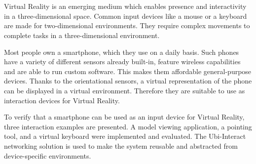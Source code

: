 \chapter{\abstractname}

Virtual Reality is an emerging medium which enables presence and interactivity in a three-dimensional space. Common input devices like a mouse or a keyboard are made for two-dimensional environments. They require complex movements to complete tasks in a three-dimensional environment.%

Most people own a smartphone, which they use on a daily basis. Such phones have a variety of different sensors already built-in, feature wireless capabilities and are able to run custom software. This makes them affordable general-purpose devices. Thanks to the orientational sensors, a virtual representation of the phone can be displayed in a virtual environment. Therefore they are suitable to use as interaction devices for Virtual Reality.

To verify that a smartphone can be used as an input device for Virtual Reality, three interaction examples are presented. A model viewing application, a pointing tool, and a virtual keyboard were implemented and evaluated. The Ubi-Interact networking solution is used to make the system reusable and abstracted from device-specific environments.